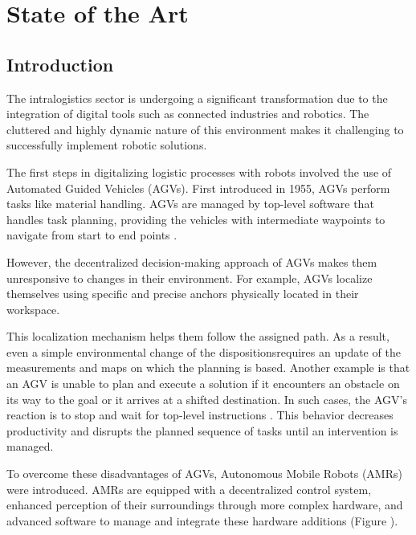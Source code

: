 \chapter{State of the Art}

\renewcommand{\chaptername}{Chapter}

\section*{Introduction}

The intralogistics sector is undergoing a significant transformation due to the 
integration of digital tools such as connected industries and robotics. The cluttered 
and highly dynamic nature of this environment makes it challenging to successfully 
implement robotic solutions.

The first steps in digitalizing logistic processes with robots involved the use of 
Automated Guided Vehicles (AGVs). First introduced in 1955, AGVs perform tasks like 
material handling. AGVs are managed by top-level software that handles task planning, 
providing the vehicles with intermediate waypoints to navigate from start to end points \cite{R7}. 

However, the decentralized decision-making approach of AGVs makes them 
unresponsive to changes in their environment. For example, AGVs localize themselves 
using specific and precise anchors physically located in their workspace. 

This localization mechanism helps them follow the assigned path. As a result, even 
a simple environmental change of the dispositionsrequires an update of the measurements 
and maps on  which the planning is based. Another example is that an AGV is unable to plan and 
execute a solution if it encounters an obstacle on its way to the goal or it arrives at a shifted 
destination. In such cases, 
the AGV’s reaction is to stop and wait for top-level instructions \cite{R8}. This behavior 
decreases productivity and disrupts the planned sequence of tasks until an intervention is managed.

To overcome these disadvantages of AGVs, Autonomous Mobile Robots (AMRs) were introduced. 
AMRs are equipped with a decentralized control system, enhanced perception of their 
surroundings through more complex hardware, and advanced software to manage and integrate 
these hardware additions (Figure ).

